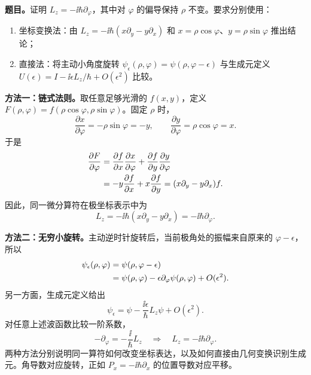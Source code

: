 \textbf{题目。}证明 $L_z=-\ii\hbar\partial_\varphi$，其中对 $\varphi$ 的偏导保持 $\rho$ 不变。要求分别使用：
\begin{enumerate}
  \item 坐标变换法：由 $L_z=-\ii\hbar(x\partial_y-y\partial_x)$ 和 $x=\rho\cos\varphi$、$y=\rho\sin\varphi$ 推出结论；
  \item 直接法：将主动小角度旋转 $\psi_\epsilon(\rho,\varphi)=\psi(\rho,\varphi-\epsilon)$ 与生成元定义 $U(\epsilon)=I-\ii\epsilon L_z/\hbar+O(\epsilon^2)$ 比较。
\end{enumerate}

\begin{checkedsolution}
\textbf{方法一：链式法则。}取任意足够光滑的 $f(x,y)$，定义
$F(\rho,\varphi)=f(\rho\cos\varphi,\rho\sin\varphi)$。固定 $\rho$ 时，
\begin{equation}
  \frac{\partial x}{\partial\varphi}=-\rho\sin\varphi=-y,\qquad
  \frac{\partial y}{\partial\varphi}=\rho\cos\varphi=x.
\end{equation}
于是
\begin{align}
  \frac{\partial F}{\partial\varphi}
  &=\frac{\partial f}{\partial x}\frac{\partial x}{\partial\varphi}
    +\frac{\partial f}{\partial y}\frac{\partial y}{\partial\varphi}\notag\\
  &=-y\frac{\partial f}{\partial x}+x\frac{\partial f}{\partial y}
   =(x\partial_y-y\partial_x)f.
\end{align}
因此，同一微分算符在极坐标表示中为
\begin{equation}
  \boxed{L_z=-\ii\hbar(x\partial_y-y\partial_x)
    =-\ii\hbar\partial_\varphi}.
\end{equation}

\textbf{方法二：无穷小旋转。}主动逆时针旋转后，当前极角处的振幅来自原来的 $\varphi-\epsilon$，所以
\begin{align}
  \psi_\epsilon(\rho,\varphi)
  &=\psi(\rho,\varphi-\epsilon)\notag\\
  &=\psi(\rho,\varphi)-\epsilon\partial_\varphi\psi(\rho,\varphi)
    +O(\epsilon^2).
\end{align}
另一方面，生成元定义给出
\begin{equation}
  \psi_\epsilon=\psi-\frac{\ii\epsilon}{\hbar}L_z\psi+O(\epsilon^2).
\end{equation}
对任意上述波函数比较一阶系数，
\begin{equation}
  -\partial_\varphi=-\frac{\ii}{\hbar}L_z
  \quad\Longrightarrow\quad
  \boxed{L_z=-\ii\hbar\partial_\varphi}.
\end{equation}
两种方法分别说明同一算符如何改变坐标表达，以及如何直接由几何变换识别生成元。角导数对应旋转，正如 $P_x=-\ii\hbar\partial_x$ 的位置导数对应平移。
\end{checkedsolution}

